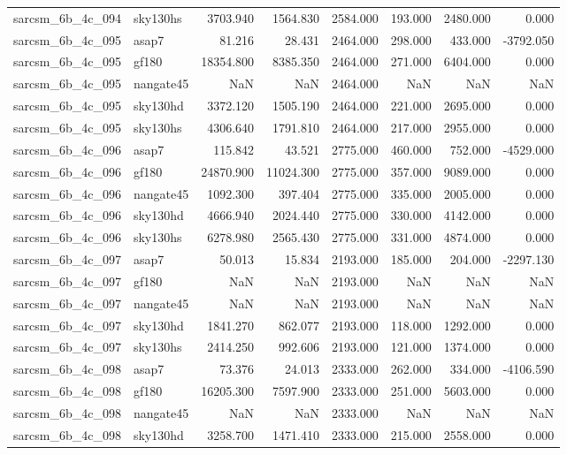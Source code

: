\begin{tabular}{llrrrrrr}
sarcsm\_6b\_4c\_094 & sky130hs & 3703.940 & 1564.830 & 2584.000 & 193.000 & 2480.000 & 0.000 \\
sarcsm\_6b\_4c\_095 & asap7 & 81.216 & 28.431 & 2464.000 & 298.000 & 433.000 & -3792.050 \\
sarcsm\_6b\_4c\_095 & gf180 & 18354.800 & 8385.350 & 2464.000 & 271.000 & 6404.000 & 0.000 \\
sarcsm\_6b\_4c\_095 & nangate45 & NaN & NaN & 2464.000 & NaN & NaN & NaN \\
sarcsm\_6b\_4c\_095 & sky130hd & 3372.120 & 1505.190 & 2464.000 & 221.000 & 2695.000 & 0.000 \\
sarcsm\_6b\_4c\_095 & sky130hs & 4306.640 & 1791.810 & 2464.000 & 217.000 & 2955.000 & 0.000 \\
sarcsm\_6b\_4c\_096 & asap7 & 115.842 & 43.521 & 2775.000 & 460.000 & 752.000 & -4529.000 \\
sarcsm\_6b\_4c\_096 & gf180 & 24870.900 & 11024.300 & 2775.000 & 357.000 & 9089.000 & 0.000 \\
sarcsm\_6b\_4c\_096 & nangate45 & 1092.300 & 397.404 & 2775.000 & 335.000 & 2005.000 & 0.000 \\
sarcsm\_6b\_4c\_096 & sky130hd & 4666.940 & 2024.440 & 2775.000 & 330.000 & 4142.000 & 0.000 \\
sarcsm\_6b\_4c\_096 & sky130hs & 6278.980 & 2565.430 & 2775.000 & 331.000 & 4874.000 & 0.000 \\
sarcsm\_6b\_4c\_097 & asap7 & 50.013 & 15.834 & 2193.000 & 185.000 & 204.000 & -2297.130 \\
sarcsm\_6b\_4c\_097 & gf180 & NaN & NaN & 2193.000 & NaN & NaN & NaN \\
sarcsm\_6b\_4c\_097 & nangate45 & NaN & NaN & 2193.000 & NaN & NaN & NaN \\
sarcsm\_6b\_4c\_097 & sky130hd & 1841.270 & 862.077 & 2193.000 & 118.000 & 1292.000 & 0.000 \\
sarcsm\_6b\_4c\_097 & sky130hs & 2414.250 & 992.606 & 2193.000 & 121.000 & 1374.000 & 0.000 \\
sarcsm\_6b\_4c\_098 & asap7 & 73.376 & 24.013 & 2333.000 & 262.000 & 334.000 & -4106.590 \\
sarcsm\_6b\_4c\_098 & gf180 & 16205.300 & 7597.900 & 2333.000 & 251.000 & 5603.000 & 0.000 \\
sarcsm\_6b\_4c\_098 & nangate45 & NaN & NaN & 2333.000 & NaN & NaN & NaN \\
sarcsm\_6b\_4c\_098 & sky130hd & 3258.700 & 1471.410 & 2333.000 & 215.000 & 2558.000 & 0.000 \\

\end{tabular}
